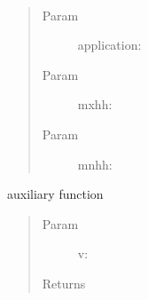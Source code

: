 \documentclass[letterpaper,10pt,english]{sphinxmanual}
\begin{document}

\begin{fulllineitems}
\label{index:SuperHubProcessing.hourlyHistogram}~\begin{quote}\begin{description}
\item[{Param }] \leavevmode
application:

\item[{Param }] \leavevmode
mxhh:

\item[{Param }] \leavevmode
mnhh:

\end{description}\end{quote}

\end{fulllineitems}


\begin{fulllineitems}
\label{index:SuperHubProcessing.itemkeysort}
auxiliary function
\begin{quote}\begin{description}
\item[{Param }] \leavevmode
v:

\item[{Returns}] \leavevmode


\end{description}\end{quote}

\end{fulllineitems}

\end{document}
